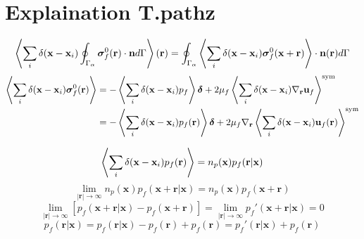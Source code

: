 \section{Explaination T.pathz}



\begin{equation}
    \left<\sum_i \delta(\textbf{x}-\textbf{x}_i) \oint_{\Gamma_{\alpha}}  \bm\sigma_f^0(\textbf{r}) \cdot \textbf{n} d\Gamma\right>(\textbf{r})
    =
    \oint_{\Gamma_{\alpha}}  \left<\sum_i \delta(\textbf{x}-\textbf{x}_i) \bm\sigma_f^0(\textbf{x}+ \textbf{r}) \right>\cdot \textbf{n}(\textbf{r}) d\Gamma
\end{equation}
\begin{align}
    \left<\sum_i \delta(\textbf{x}-\textbf{x}_i) \bm\sigma_f^0(\textbf{r}) \right>
    &=
    - \left<\sum_i \delta(\textbf{x}-\textbf{x}_i)  p_f \right>\bm\delta
    +2 \mu_f \left<\sum_i \delta(\textbf{x}-\textbf{x}_i) \mathbf{\nabla}_\textbf{r} \textbf{u}_f \right>^\text{sym}\\
    &=
    - \left<\sum_i \delta(\textbf{x}-\textbf{x}_i)  p_f(\textbf{r}) \right>\bm\delta
    +2 \mu_f \mathbf{\nabla}_\textbf{r} \left<\sum_i \delta(\textbf{x}-\textbf{x}_i)  \textbf{u}_f(\textbf{r})\right>^\text{sym}
\end{align}

\begin{equation}
    \left<\sum_i \delta(\textbf{x}-\textbf{x}_i)  p_f(\textbf{r}) \right>
    =
    n_p(\textbf{x}) p_f(\textbf{r}|\textbf{x})
\end{equation}
\begin{equation}
    \lim_{|\textbf{r}|\to\infty} 
    n_p(\textbf{x}) p_f(\textbf{x}+ \textbf{r}|\textbf{x}) 
    = 
    n_p(\textbf{x}) p_f(\textbf{x}+ \textbf{r})
\end{equation}
\begin{equation}
    \lim_{|\textbf{r}|\to\infty} 
    [p_f(\textbf{x}+ \textbf{r}|\textbf{x}) -p_f(\textbf{x}+ \textbf{r})]
    = 
    \lim_{|\textbf{r}|\to\infty} 
    p_f'(\textbf{x}+ \textbf{r}|\textbf{x}) 
    =0 
\end{equation}
\begin{equation}
    p_f(\textbf{r}|\textbf{x})
    = 
    p_f(\textbf{r}|\textbf{x})
    -p_f(\textbf{r})
    + p_f(\textbf{r})
    = 
    p_f'(\textbf{r}|\textbf{x})
    + p_f(\textbf{r})
\end{equation}

